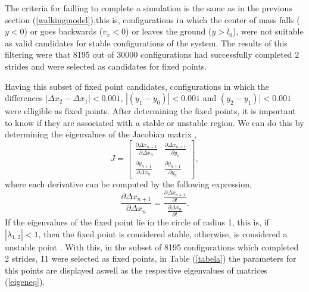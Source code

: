 The criteria for failling to complete a simulation is the same as in the previous section (\ref{walkingmodel}),this is, configurations in which the center of mass falls ($y<0$) or goes backwards ($v_x<0$) or leaves the ground ($y>l_0$), were not suitable as valid candidates for stable configurations of the system. The results of this filtering were that 8195 out of 30000 configurations had successfully completed 2 strides and were selected as candidates for fixed points.

Having this subset of fixed point candidates, configurations in which the differences $|\Delta x_2-\Delta x_1|< 0.001$, $|(y_1-y_0)|<0.001$ and $(y_2-y_1)|<0.001$ were elligible as fixed points. After determining the fixed points, it is important to know if they are associated with a stable or unstable region. We can do this by determining the eigenvalues of the Jacobian matrix \cite{Seyfarth2006},
\begin{equation}
 J= \begin{bmatrix}
    \frac{\partial \Delta x_{n+1}}{\partial \Delta x_{n}} & \frac{\partial \Delta x_{n+1}}{\partial  y_{n}}\\
     \frac{\partial  y_{n+1}}{\partial \Delta x_{n}} & \frac{\partial y_{n+1}}{\partial  y_{n}}
  \end{bmatrix},
  \label{eigeneq}
  \end{equation}
\noindent where each derivative can be computed by the following expression,
\begin{equation}
    \frac{\partial \Delta x_{n+1}}{\partial \Delta x_{n}}=  \frac{\frac{\partial \Delta x_{n+1}}{\partial t}}{\frac{\partial \Delta x_{n}}{\partial t}}. 
\end{equation}
If the eigenvalues of the fixed point lie in the circle of radius 1, this is, if $|\lambda_{1,2}|<1$, then the fixed point is considered stable, otherwise, is considered a unstable point \cite{Strogatz2001}. With this, in the subset of 8195 configurations which completed 2 strides, 11 were selected as fixed points, in Table (\ref{tabela}) the parameters for this points are displayed aswell as the respective eigenvalues of matrices (\ref{eigeneq}).

